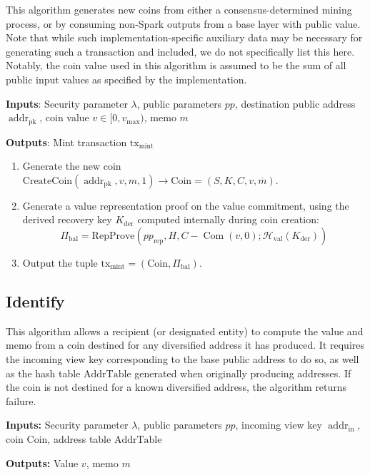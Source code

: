 \documentclass{llncs}
\newcommand{\hash}{\mathcal{H}}
\newcommand{\addr}{\operatorname{addr}}
\newcommand{\com}{\operatorname{Com}}
\begin{document}
This algorithm generates new coins from either a consensus-determined mining process, or by consuming non-Spark outputs from a base layer with public value.
Note that while such implementation-specific auxiliary data may be necessary for generating such a transaction and included, we do not specifically list this here.
Notably, the coin value used in this algorithm is assumed to be the sum of all public input values as specified by the implementation.

\textbf{Inputs}: Security parameter $\lambda$, public parameters $pp$, destination public address $\addr_{\text{pk}}$, coin value $v \in [0, v_{\text{max}})$, memo $m$

\textbf{Outputs}: Mint transaction $\text{tx}_{\text{mint}}$

\begin{enumerate}
\item Generate the new coin $\text{CreateCoin}(\addr_{\text{pk}}, v, m, 1) \to \text{Coin} = (S, K, C, v, \overline{m})$.
\item Generate a value representation proof on the value commitment, using the derived recovery key $K_{\text{der}}$ computed internally during coin creation: $$\Pi_{\text{bal}} = \text{RepProve}(pp_{\text{rep}},H,C - \com(v,0); \hash_{\text{val}}(K_{\text{der}}))$$
\item Output the tuple $\text{tx}_{\text{mint}} = (\text{Coin}, \Pi_{\text{bal}})$.
\end{enumerate}


\subsection{Identify}

This algorithm allows a recipient (or designated entity) to compute the value and memo from a coin destined for any diversified address it has produced.
It requires the incoming view key corresponding to the base public address to do so, as well as the hash table $\text{AddrTable}$ generated when originally producing addresses.
If the coin is not destined for a known diversified address, the algorithm returns failure.

\textbf{Inputs:} Security parameter $\lambda$, public parameters $pp$, incoming view key $\addr_{\text{in}}$, coin $\text{Coin}$, address table $\text{AddrTable}$

\textbf{Outputs:} Value $v$, memo $m$
\end{document}
